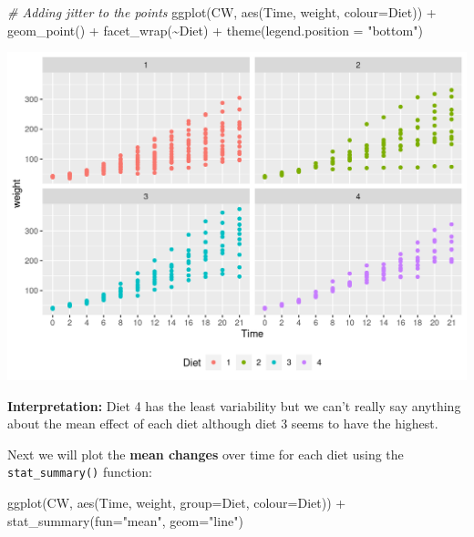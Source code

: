\documentclass[
  14pt,
]{memoir}
\newenvironment{Shaded}{\begin{snugshade}}{\end{snugshade}}
\newcommand{\AttributeTok}[1]{\textcolor[rgb]{0.77,0.63,0.00}{#1}}
\newcommand{\CommentTok}[1]{\textcolor[rgb]{0.56,0.35,0.01}{\textit{#1}}}
\newcommand{\FunctionTok}[1]{\textcolor[rgb]{0.00,0.00,0.00}{#1}}
\newcommand{\NormalTok}[1]{#1}
\newcommand{\SpecialCharTok}[1]{\textcolor[rgb]{0.00,0.00,0.00}{#1}}
\newcommand{\StringTok}[1]{\textcolor[rgb]{0.31,0.60,0.02}{#1}}
\begin{document}
\begin{Shaded}
\begin{Highlighting}[]
\CommentTok{\# Adding jitter to the points}
\FunctionTok{ggplot}\NormalTok{(CW, }\FunctionTok{aes}\NormalTok{(Time, weight, }\AttributeTok{colour=}\NormalTok{Diet)) }\SpecialCharTok{+}
  \FunctionTok{geom\_point}\NormalTok{() }\SpecialCharTok{+}
  \FunctionTok{facet\_wrap}\NormalTok{(}\SpecialCharTok{\textasciitilde{}}\NormalTok{Diet) }\SpecialCharTok{+}
  \FunctionTok{theme}\NormalTok{(}\AttributeTok{legend.position =} \StringTok{"bottom"}\NormalTok{)}
\end{Highlighting}
\end{Shaded}

\begin{center}\includegraphics[width=0.8\linewidth]{figure/minimal-ScatterPlot-1} \end{center}

\textbf{Interpretation:} Diet 4 has the least variability but we can't really say anything about the mean effect
of each diet although diet 3 seems to have the highest.

Next we will plot the \textbf{mean changes} over time for each diet using the \texttt{stat\_summary()} function:

\begin{Shaded}
\begin{Highlighting}[]
\FunctionTok{ggplot}\NormalTok{(CW, }\FunctionTok{aes}\NormalTok{(Time, weight, }
               \AttributeTok{group=}\NormalTok{Diet, }\AttributeTok{colour=}\NormalTok{Diet)) }\SpecialCharTok{+}
  \FunctionTok{stat\_summary}\NormalTok{(}\AttributeTok{fun=}\StringTok{"mean"}\NormalTok{, }\AttributeTok{geom=}\StringTok{"line"}\NormalTok{) }
\end{Highlighting}
\end{Shaded}
\end{document}
